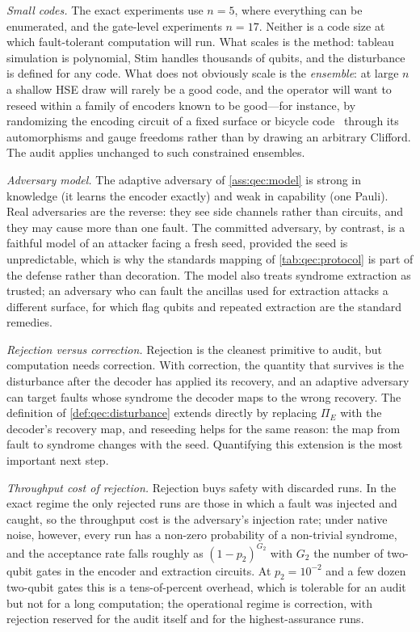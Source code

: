 \emph{Small codes.} The exact experiments use $n=5$, where everything can be enumerated, and the gate-level experiments $n=17$. Neither is a code size at which fault-tolerant computation will run. What scales is the method: tableau simulation is polynomial, Stim handles thousands of qubits, and the disturbance is defined for any code. What does not obviously scale is the \emph{ensemble}: at large $n$ a shallow HSE draw will rarely be a good code, and the operator will want to reseed within a family of encoders known to be good---for instance, by randomizing the encoding circuit of a fixed surface or bicycle code~\cite{fowler2012surfacecodes,bravyi2024bicycle} through its automorphisms and gauge freedoms rather than by drawing an arbitrary Clifford. The audit applies unchanged to such constrained ensembles.

\emph{Adversary model.} The adaptive adversary of \cref{ass:qec:model} is strong in knowledge (it learns the encoder exactly) and weak in capability (one Pauli). Real adversaries are the reverse: they see side channels rather than circuits, and they may cause more than one fault. The committed adversary, by contrast, is a faithful model of an attacker facing a fresh seed, provided the seed is unpredictable, which is why the standards mapping of \cref{tab:qec:protocol} is part of the defense rather than decoration. The model also treats syndrome extraction as trusted; an adversary who can fault the ancillas used for extraction attacks a different surface, for which flag qubits and repeated extraction are the standard remedies.

\emph{Rejection versus correction.} Rejection is the cleanest primitive to audit, but computation needs correction. With correction, the quantity that survives is the disturbance after the decoder has applied its recovery, and an adaptive adversary can target faults whose syndrome the decoder maps to the wrong recovery. The definition of \cref{def:qec:disturbance} extends directly by replacing $\Pi_E$ with the decoder's recovery map, and reseeding helps for the same reason: the map from fault to syndrome changes with the seed. Quantifying this extension is the most important next step.

\emph{Throughput cost of rejection.} Rejection buys safety with discarded runs. In the exact regime the only rejected runs are those in which a fault was injected and caught, so the throughput cost is the adversary's injection rate; under native noise, however, every run has a non-zero probability of a non-trivial syndrome, and the acceptance rate falls roughly as $(1-p_2)^{G_2}$ with $G_2$ the number of two-qubit gates in the encoder and extraction circuits. At $p_2=10^{-2}$ and a few dozen two-qubit gates this is a tens-of-percent overhead, which is tolerable for an audit but not for a long computation; the operational regime is correction, with rejection reserved for the audit itself and for the highest-assurance runs.

